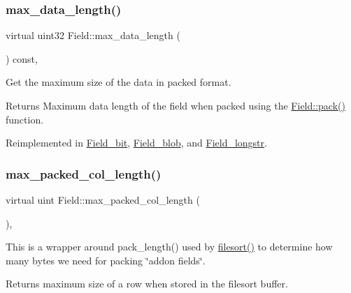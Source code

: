 \mbox{\label{classField_ab628f9b9a6253a5b675c97095bf01aac}} 
\subsubsection{\texorpdfstring{max\+\_\+data\+\_\+length()}{max\_data\_length()}}
{\footnotesize\ttfamily virtual uint32 Field\+::max\+\_\+data\+\_\+length (\begin{DoxyParamCaption}{ }\end{DoxyParamCaption}) const\hspace{0.3cm}{\ttfamily [inline]}, {\ttfamily [virtual]}}

Get the maximum size of the data in packed format.

\begin{DoxyReturn}{Returns}
Maximum data length of the field when packed using the \mbox{\hyperlink{classField_a9eaff8d3425ef0e1da69b32cbd8f2879}{Field\+::pack()}} function. 
\end{DoxyReturn}


Reimplemented in \mbox{\hyperlink{classField__bit_acc664ced1dd95a2370fc58e7bf6e70bc}{Field\+\_\+bit}}, \mbox{\hyperlink{classField__blob_ae15f550d9b0f82acf200c45dc34caf07}{Field\+\_\+blob}}, and \mbox{\hyperlink{classField__longstr_a5af463c25b00c34e0d14e3780771fee0}{Field\+\_\+longstr}}.

\mbox{\label{classField_a05d15db9879fe9ae68415819b3dbf96f}} 
\subsubsection{\texorpdfstring{max\+\_\+packed\+\_\+col\+\_\+length()}{max\_packed\_col\_length()}}
{\footnotesize\ttfamily virtual uint Field\+::max\+\_\+packed\+\_\+col\+\_\+length (\begin{DoxyParamCaption}{ }\end{DoxyParamCaption})\hspace{0.3cm}{\ttfamily [inline]}, {\ttfamily [virtual]}}

This is a wrapper around pack\+\_\+length() used by \mbox{\hyperlink{filesort_8cc_a953fde8362f86f7fb832e9a1e2c06530}{filesort()}} to determine how many bytes we need for packing \char`\"{}addon fields\char`\"{}. \begin{DoxyReturn}{Returns}
maximum size of a row when stored in the filesort buffer. 
\end{DoxyReturn}


